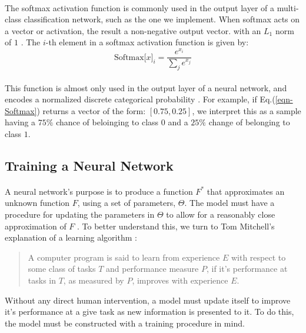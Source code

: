 \documentclass[12pt,letterpaper]{article}
\begin{document}
\paragraph*{}The softmax activation function is commonly used in the output layer of a multi-class classification network, such as the one we implement. When softmax acts on a vector or activation, the result a non-negative output vector. with an $L_1$ norm of $1$ \cite{Geron,Goodfellow,Virtanen}. The $i$-th element in a softmax activation function is given by:
\begin{equation}
\label{eqn-Softmax}
\text{Softmax}\big[ x \big]_{i} = \frac{e^{x_i}}{\sum_{j}e^{x_j}}
\end{equation}

\paragraph*{}This function is almost only used in the output layer of a neural network, and encodes a normalized discrete categorical probability \cite{Loy,Virtanen}. For example, if Eq.(\ref{eqn-Softmax}) returns a vector of the form: $[ 0.75 , 0.25]$, we interpret this as a sample having a $75\%$ chance of beloinging to class $0$ and a $25\%$ change of belonging to class $1$.



\subsection{Training a Neural Network}
\label{subsec-Training}

\paragraph*{}A neural network's purpose is to produce a function $F^*$ that approximates an unknown function $F$, using a set of parameters, $\Theta$. The model must have a procedure for updating the parameters in $\Theta$ to allow for a reasonably close approximation of $F$ \cite{Goodfellow}. To better understand this, we turn to Tom Mitchell's explanation of a learning algorithm \cite{Mitchell}:
\begin{quote}
A computer program is said to learn from experience $E$ with respect to some class of tasks $T$ and performance measure $P$, if it's performance at tasks in $T$, as measured by $P$, improves with experience $E$.
\end{quote}
Without any direct human intervention, a model must update itself to improve it's performance at a give task as new information is presented to it. To do this, the model must be constructed with a training procedure in mind. 
\end{document}
